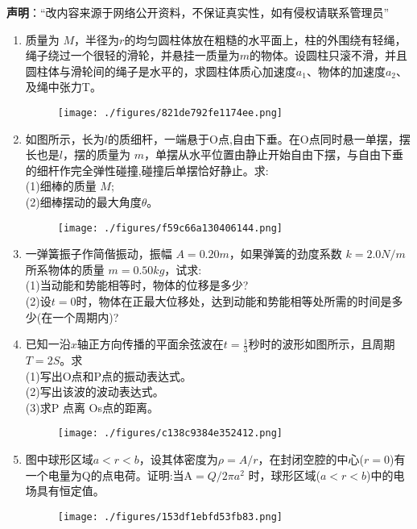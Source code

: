 \textbf{声明}：“改内容来源于网络公开资料，不保证真实性，如有侵权请联系管理员”


\begin{enumerate}
\item 质量为 $M$，半径为$r$的均匀圆柱体放在粗糙的水平面上，柱的外围绕有轻绳，绳子绕过一个很轻的滑轮，并悬挂一质量为$m $的物体。设圆柱只滚不滑，并且圆柱体与滑轮间的绳子是水平的，求圆柱体质心加速度$ a_1$、物体的加速度$ a_2$、及绳中张力T。
\begin{figure}[ht]
\centering
\texttt{[image: ./figures/821de792fe1174ee.png]}
\caption{} \label{fig_SD05_1}
\end{figure}
\item 如图所示，长为$l$的质细杆，一端悬于O点,自由下垂。在O点同时悬一单摆，摆长也是$l$，摆的质量为 $m$，单摆从水平位置由静止开始自由下摆，与自由下垂的细杆作完全弹性碰撞,碰撞后单摆恰好静止。求:\\
(1)细棒的质量 $M;$\\
(2)细棒摆动的最大角度$\theta$。
\begin{figure}[ht]
\centering
\texttt{[image: ./figures/f59c66a130406144.png]}
\caption{} \label{fig_SD05_2}
\end{figure}
\item 一弹簧振子作简偕振动，振幅 $A=0.20m$，如果弹簧的劲度系数 $k=2.0N/m$所系物体的质量 $m=0.50kg$，试求:\\
(1)当动能和势能相等时，物体的位移是多少?\\
(2)设$t=0$时，物体在正最大位移处，达到动能和势能相等处所需的时间是多少(在一个周期内)?
\item 已知一沿$x$轴正方向传播的平面余弦波在$t=\frac{1}{3}$秒时的波形如图所示，且周期$T=2S$。求\\
(1)写出O点和P点的振动表达式。\\
(2)写出该波的波动表达式。\\
(3)求P 点离 Os点的距离。
\begin{figure}[ht]
\centering
\texttt{[image: ./figures/c138c9384e352412.png]}
\caption{} \label{fig_SD05_3}
\end{figure}
\item 图中球形区域$a<r<b$，设其体密度为$\rho=A/r$，在封闭空腔的中心($r=0$)有一个电量为Q的点电荷。证明:当A$=Q/2\pi a^2$ 时，球形区域($a<r<b$)中的电场具有恒定值。
\begin{figure}[ht]
\centering
\texttt{[image: ./figures/153df1ebfd53fb83.png]}
\caption{} \label{fig_SD05_4}

\end{figure}
\end{enumerate}
